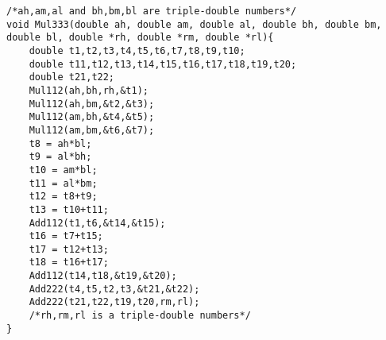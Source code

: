 \begin{lstlisting}
/*ah,am,al and bh,bm,bl are triple-double numbers*/
void Mul333(double ah, double am, double al, double bh, double bm, double bl, double *rh, double *rm, double *rl){
    double t1,t2,t3,t4,t5,t6,t7,t8,t9,t10;
    double t11,t12,t13,t14,t15,t16,t17,t18,t19,t20;
    double t21,t22;
    Mul112(ah,bh,rh,&t1);
    Mul112(ah,bm,&t2,&t3);
    Mul112(am,bh,&t4,&t5);
    Mul112(am,bm,&t6,&t7);
    t8 = ah*bl;
    t9 = al*bh;
    t10 = am*bl;
    t11 = al*bm; 
    t12 = t8+t9;
    t13 = t10+t11;
    Add112(t1,t6,&t14,&t15);
    t16 = t7+t15;
    t17 = t12+t13;
    t18 = t16+t17;
    Add112(t14,t18,&t19,&t20);
    Add222(t4,t5,t2,t3,&t21,&t22);
    Add222(t21,t22,t19,t20,rm,rl);
    /*rh,rm,rl is a triple-double numbers*/
}
\end{lstlisting}
\newpage

